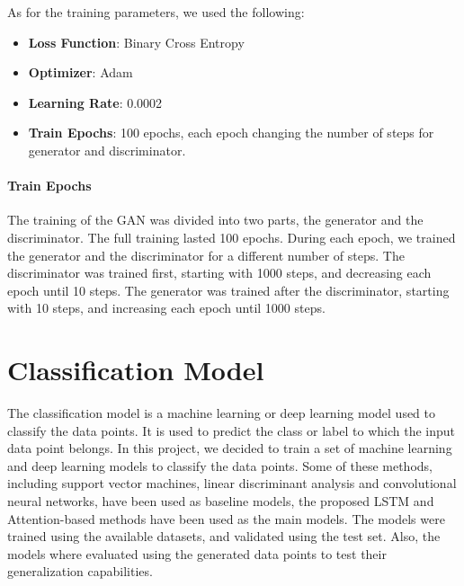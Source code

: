 As for the training parameters, we used the following:
\begin{itemize}
    \item \textbf{Loss Function}: Binary Cross Entropy
    \item \textbf{Optimizer}: Adam
    \item \textbf{Learning Rate}: 0.0002
    \item \textbf{Train Epochs}: 100 epochs, each epoch changing the number of steps for generator and discriminator.
\end{itemize}
\paragraph*{Train Epochs}
The training of the GAN was divided into two parts, the generator and the discriminator.
The full training lasted 100 epochs.
During each epoch, we trained the generator and the discriminator for a different number of steps.
The discriminator was trained first, starting with 1000 steps, and decreasing each epoch until 10 steps.
The generator was trained after the discriminator, starting with 10 steps, and increasing each epoch until 1000 steps.


\section{Classification Model}
The classification model is a machine learning or deep learning model used to classify the data points.
It is used to predict the class or label to which the input data point belongs.
In this project, we decided to train a set of machine learning and deep learning models to classify the data points.
Some of these methods, including support vector machines, linear discriminant analysis and convolutional neural networks, have been used as baseline models, the proposed LSTM and Attention-based methods have been used as the main models.
The models were trained using the available datasets, and validated using the test set.
Also, the models where evaluated using the generated data points to test their generalization capabilities.

